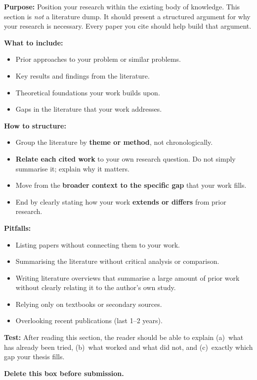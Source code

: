 \documentclass[12pt,a4paper,twocolumn]{article}
\begin{document}
\begin{guidancebox}
\textbf{Purpose:} Position your research within the existing body of
knowledge. This section is \emph{not} a literature dump. It should present
a structured argument for why your research is necessary. Every paper you
cite should help build that argument.

\textbf{What to include:}
\begin{itemize}[leftmargin=*, nosep]
  \item Prior approaches to your problem or similar problems.
  \item Key results and findings from the literature.
  \item Theoretical foundations your work builds upon.
  \item Gaps in the literature that your work addresses.
\end{itemize}

\textbf{How to structure:}
\begin{itemize}[leftmargin=*, nosep]
  \item Group the literature by \textbf{theme or method}, not chronologically.
  \item \textbf{Relate each cited work} to your own research question.
    Do not simply summarise it; explain why it matters.
  \item Move from the \textbf{broader context to the specific gap} that your work fills.
  \item End by clearly stating how your work \textbf{extends or differs}
    from prior research.
\end{itemize}

\textbf{Pitfalls:}
\begin{itemize}[leftmargin=*, nosep]
  \item Listing papers without connecting them to your work.
  \item Summarising the literature without critical analysis or comparison.
  \item Writing literature overviews that summarise a large amount of prior
    work without clearly relating it to the author's own study.
  \item Relying only on textbooks or secondary sources.
  \item Overlooking recent publications (last 1--2 years).
\end{itemize}

\textbf{Test:} After reading this section, the reader should be able to explain
(a)~what has already been tried, (b)~what worked and what did not, and
(c)~exactly which gap your thesis fills.

\textbf{Delete this box before submission.}
\end{guidancebox}
\end{document}
